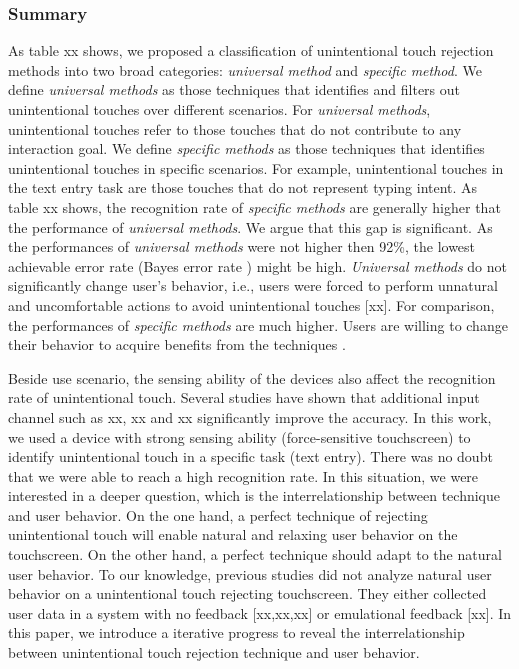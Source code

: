 \subsubsection{Summary}

As table xx shows, we proposed a classification of unintentional touch rejection methods into two broad categories: \emph{universal method} and \emph{specific method}. We define \emph{universal methods} as those techniques that identifies and filters out unintentional touches over different scenarios. For \emph{universal methods}, unintentional touches refer to those touches that do not contribute to any interaction goal. We define \emph{specific methods} as those techniques that identifies unintentional touches in specific scenarios. For example, unintentional touches in the text entry task are those touches that do not represent typing intent. As table xx shows, the recognition rate of \emph{specific methods} are generally higher that the performance of \emph{universal methods}. We argue that this gap is significant. As the performances of \emph{universal methods} were not higher then 92\%, the lowest achievable error rate (Bayes error rate \cite{tumer1996estimating}) might be high. \emph{Universal methods} do not significantly change user's behavior, i.e., users were forced to perform unnatural and uncomfortable actions to avoid unintentional touches \cite{2014-PenMightier} [xx]. For comparison, the performances of \emph{specific methods} are much higher. Users are willing to change their behavior to acquire benefits from the techniques \cite{2013-TapBoard,2016-TapBoard2}.

Beside use scenario, the sensing ability of the devices also affect the recognition rate of unintentional touch. Several studies have shown that additional input channel such as xx, xx and xx significantly improve the accuracy. In this work, we used a device with strong sensing ability (force-sensitive touchscreen) to identify unintentional touch in a specific task (text entry). There was no doubt that we were able to reach a high recognition rate. In this situation, we were interested in a deeper question, which is the interrelationship between technique and user behavior. On the one hand, a perfect technique of rejecting unintentional touch will enable natural and relaxing user behavior on the touchscreen. On the other hand, a perfect technique should adapt to the natural user behavior. To our knowledge, previous studies did not analyze natural user behavior on a unintentional touch rejecting touchscreen. They either collected user data in a system with no feedback [xx,xx,xx] or emulational feedback [xx]. In this paper, we introduce a iterative progress to reveal the interrelationship between unintentional touch rejection technique and user behavior.

